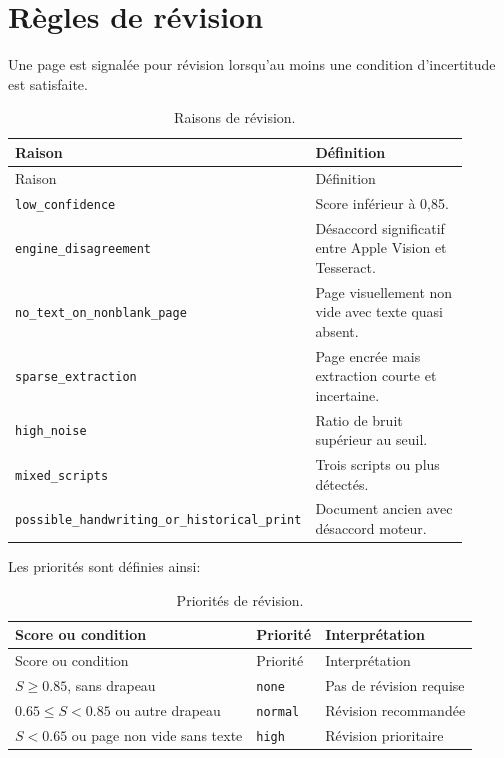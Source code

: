 \documentclass[11pt,a4paper]{article}
\begin{document}
\section{Règles de révision}

Une page est signalée pour révision lorsqu'au moins une condition d'incertitude est satisfaite.

\begin{longtable}{p{0.35\linewidth}p{0.55\linewidth}}
\caption{Raisons de révision.}\\
\toprule
Raison & Définition \\
\midrule
\endfirsthead
\toprule
Raison & Définition \\
\midrule
\endhead
\texttt{low\_confidence} & Score inférieur à 0,85. \\
\texttt{engine\_disagreement} & Désaccord significatif entre Apple Vision et Tesseract. \\
\texttt{no\_text\_on\_nonblank\_page} & Page visuellement non vide avec texte quasi absent. \\
\texttt{sparse\_extraction} & Page encrée mais extraction courte et incertaine. \\
\texttt{high\_noise} & Ratio de bruit supérieur au seuil. \\
\texttt{mixed\_scripts} & Trois scripts ou plus détectés. \\
\texttt{possible\_handwriting\_}\linebreak\texttt{or\_historical\_print} & Document ancien avec désaccord moteur. \\
\bottomrule
\end{longtable}

Les priorités sont définies ainsi:

\begin{longtable}{lll}
\caption{Priorités de révision.}\\
\toprule
Score ou condition & Priorité & Interprétation \\
\midrule
\endfirsthead
\toprule
Score ou condition & Priorité & Interprétation \\
\midrule
\endhead
\(S \geq 0.85\), sans drapeau & \texttt{none} & Pas de révision requise \\
\(0.65 \leq S < 0.85\) ou autre drapeau & \texttt{normal} & Révision recommandée \\
\(S < 0.65\) ou page non vide sans texte & \texttt{high} & Révision prioritaire \\
\bottomrule
\end{longtable}
\end{document}
